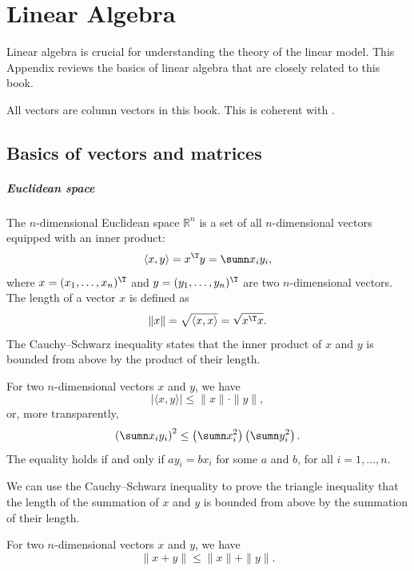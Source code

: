  
\chapter{Linear Algebra}\label{chapter::linear-algebra}
 

Linear algebra is crucial for understanding the theory of the linear model. This Appendix reviews the basics of linear algebra that are closely related to this book.


All vectors are column vectors in this book. This is coherent with . 


\section{Basics of vectors and matrices}
 \label{sec::basics-vectors-matrices}

\paragraph*{Euclidean space}

The $n$-dimensional Euclidean space $\mathbb{R}^{n}$ is a set of
all $n$-dimensional vectors equipped with an inner product: 
$$
\langle x,y \rangle =x^{\T}y=\sumn x_{i}y_{i}, 
$$
where $x=(x_{1},\ldots,x_{n})^{\T}$ and $y=(y_{1},\ldots,y_{n})^{\T}$
are two $n$-dimensional vectors. The length of a vector $x$
is defined as 
$$
\|x\|=\sqrt{\langle x,x\rangle }=\sqrt{x^{\T}x}.
$$ 
The Cauchy--Schwarz inequality states that the inner product of $x$ and $y$ is bounded from above by the product of their length. 

\begin{proposition}
\label{prop::cauchy-schwarz}
For two $n$-dimensional vectors $x$ and $y$, we have 
\[
|\langle x,y \rangle |\leq\|x\|\cdot\|y\|,
\]
or, more transparently,
$$
\left(  \sumn x_i y_i  \right)^2  \leq  \left(  \sumn x_i^2  \right) \left(  \sumn y_i^2  \right)  . 
$$
The equality holds if and only if $ a y_i = bx_i$ for some $a$ and $b$, for all $i=1,\ldots, n.$
\end{proposition}

We can use the Cauchy--Schwarz inequality to prove the triangle inequality that the length of the summation of $x$ and $y$ is bounded from above by the summation of their length. 

\begin{proposition}
\label{proo::triangle}
For two $n$-dimensional vectors $x$ and $y$, we have 
$$
\| x + y \| \leq \| x\| + \| y\| .  
$$
\end{proposition}


